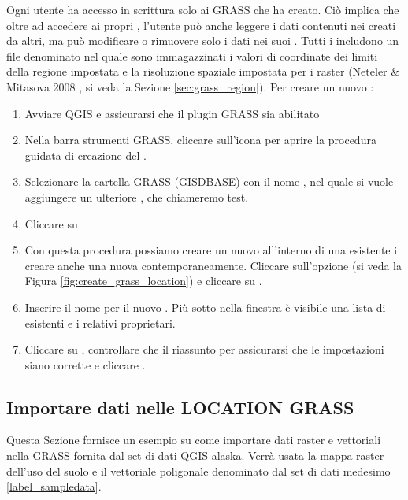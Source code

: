 Ogni utente ha accesso in scrittura solo ai  GRASS che ha
creato. Ciò implica che oltre ad accedere ai propri ,
l'utente può anche leggere i dati contenuti nei  creati da
altri, ma può modificare o rimuovere solo i dati nei suoi .
Tutti i  includono un file denominato  nel
quale sono immagazzinati i valori di coordinate dei limiti della regione
impostata e la risoluzione spaziale impostata per i raster (Neteler \& Mitasova 2008
\cite{neteler_mitasova08}, si veda la Sezione \ref{sec:grass_region}). 
Per creare un nuovo :

\begin{enumerate}
  \item Avviare QGIS e assicurarsi che il plugin GRASS sia abilitato
  \item Nella barra strumenti GRASS, cliccare sull'icona
   per aprire la procedura guidata
  di creazione del .
  \item Selezionare la cartella GRASS (GISDBASE)  con il
  nome , nel quale si vuole aggiungere un ulteriore
  , che chiameremo test.
  \item Cliccare su . 
  \item Con questa procedura possiamo creare un nuovo 
  all'interno di una  esistente i creare anche una nuova
   contemporaneamente. Cliccare sull'opzione
   (si veda la Figura
  \ref{fig:create_grass_location}) e cliccare su .
  \item Inserire il nome  per il nuovo . Più
  sotto nella finestra è visibile una lista di  esistenti e
  i relativi proprietari.
  \item Cliccare su , controllare che il riassunto per
  assicurarsi che le impostazioni siano corrette e cliccare .
\end{enumerate}

\subsection{Importare dati nelle LOCATION GRASS}\label{sec:import_loc_data}

Questa Sezione fornisce un esempio su come importare dati raster e vettoriali
nella  GRASS  fornita dal set di dati QGIS
alaska. Verrà usata la mappa raster dell'uso del suolo  e
il vettoriale poligonale denominato  dal set di dati
medesimo \ref{label_sampledata}.

